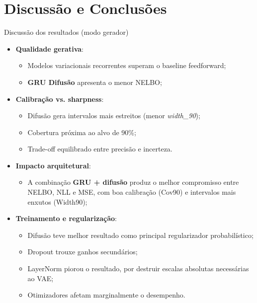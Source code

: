 \documentclass[10pt,aspectratio=169]{beamer}
\begin{document}
\section{Discussão e Conclusões}
\begin{frame}{Discussão dos resultados (modo gerador)}
  \begin{itemize}
    \item \textbf{Qualidade gerativa}:
      \begin{itemize}
        \item Modelos variacionais recorrentes superam o baseline feedforward;
        \item \textbf{GRU  Difusão} apresenta o menor NELBO;
         \end{itemize}

    \item \textbf{Calibração vs. sharpness}:
      \begin{itemize}
        \item Difusão gera intervalos mais estreitos (menor \textit{width\_90});
        \item Cobertura próxima ao alvo de 90\%;
        \item Trade-off equilibrado entre precisão e incerteza.
      \end{itemize}

    \item \textbf{Impacto arquitetural}:
      \begin{itemize}
          \item A combinação \textbf{GRU + difusão} produz o melhor compromisso
              entre NELBO, NLL e MSE, com boa calibração (Cov90) e intervalos
              mais enxutos (Width90);
       \end{itemize}

    \item \textbf{Treinamento e regularização}:
      \begin{itemize}
        \item Difusão teve melhor resultado como principal regularizador probabilístico;
        \item Dropout trouxe ganhos secundários;
        \item LayerNorm piorou o resultado, por destruir escalas absolutas necessárias ao VAE;
        \item Otimizadores afetam marginalmente o desempenho.
      \end{itemize}
  \end{itemize}
\end{frame}
\end{document}
